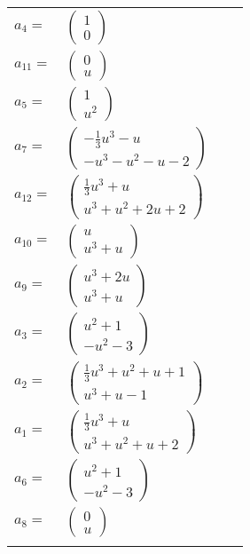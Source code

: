 \documentclass[1p]{elsarticle_modified}
\theoremstyle{definition}
\begin{document}
\begin{tabular}{m{7pt} m{180pt} m{7pt} m{180pt} }
\flushright $a_{4}=$&$\begin{pmatrix}1\\0\end{pmatrix}$ \\
\flushright $a_{11}=$&$\begin{pmatrix}0\\u\end{pmatrix}$ \\
\flushright $a_{5}=$&$\begin{pmatrix}1\\u^2\end{pmatrix}$ \\
\flushright $a_{7}=$&$\begin{pmatrix}-\frac{1}{3} u^3- u\\- u^3- u^2- u-2\end{pmatrix}$ \\
\flushright $a_{12}=$&$\begin{pmatrix}\frac{1}{3} u^3+u\\u^3+u^2+2 u+2\end{pmatrix}$ \\
\flushright $a_{10}=$&$\begin{pmatrix}u\\u^3+u\end{pmatrix}$ \\
\flushright $a_{9}=$&$\begin{pmatrix}u^3+2 u\\u^3+u\end{pmatrix}$ \\
\flushright $a_{3}=$&$\begin{pmatrix}u^2+1\\- u^2-3\end{pmatrix}$ \\
\flushright $a_{2}=$&$\begin{pmatrix}\frac{1}{3} u^3+u^2+u+1\\u^3+u-1\end{pmatrix}$ \\
\flushright $a_{1}=$&$\begin{pmatrix}\frac{1}{3} u^3+u\\u^3+u^2+u+2\end{pmatrix}$ \\
\flushright $a_{6}=$&$\begin{pmatrix}u^2+1\\- u^2-3\end{pmatrix}$ \\
\flushright $a_{8}=$&$\begin{pmatrix}0\\u\end{pmatrix}$\\&\end{tabular}
\end{document}
